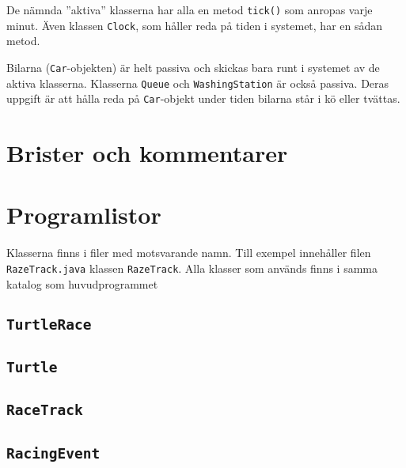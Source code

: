 \documentclass[a4paper]{article}
\newcommand{\code}[1]{\texttt{#1}} %
\begin{document}
De nämnda ''aktiva'' klasserna har alla en metod \code{tick()} som anropas varje minut. Även klassen \code{Clock}, som håller reda på tiden i systemet, har en sådan metod.

Bilarna (\code{Car}-objekten) är helt passiva och skickas bara runt i systemet av de aktiva klasserna. Klasserna \code{Queue} och \code{WashingStation} är också passiva. Deras uppgift är att hålla reda på \code{Car}-objekt under tiden bilarna står i kö eller tvättas. 


\section{Brister och kommentarer}



\section{Programlistor}
Klasserna finns i filer med motsvarande namn. Till exempel innehåller filen  \code{RazeTrack.java} klassen \code{RazeTrack}. Alla klasser som används finns i samma katalog som huvudprogrammet

\subsection{\code{TurtleRace}}


\subsection{\code{Turtle}}

\subsection{\code{RaceTrack}}

\subsection{\code{RacingEvent}}



\end{document}
